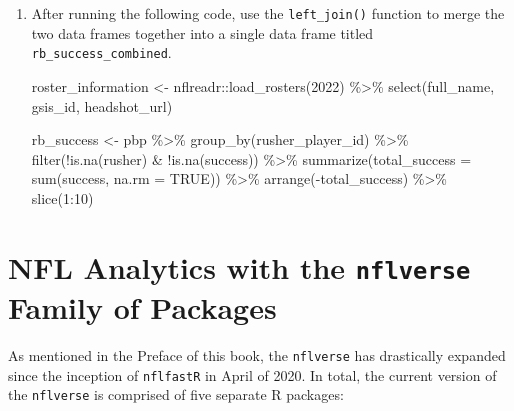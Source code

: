 \documentclass[
  letterpaper,
]{krantz}
\newenvironment{Shaded}{\begin{snugshade}}{\end{snugshade}}
\newcommand{\AttributeTok}[1]{\textcolor[rgb]{0.40,0.45,0.13}{#1}}
\newcommand{\ConstantTok}[1]{\textcolor[rgb]{0.56,0.35,0.01}{#1}}
\newcommand{\DecValTok}[1]{\textcolor[rgb]{0.68,0.00,0.00}{#1}}
\newcommand{\FunctionTok}[1]{\textcolor[rgb]{0.28,0.35,0.67}{#1}}
\newcommand{\NormalTok}[1]{\textcolor[rgb]{0.00,0.23,0.31}{#1}}
\newcommand{\OtherTok}[1]{\textcolor[rgb]{0.00,0.23,0.31}{#1}}
\newcommand{\SpecialCharTok}[1]{\textcolor[rgb]{0.37,0.37,0.37}{#1}}
\begin{document}
\begin{enumerate}
\def\labelenumi{\arabic{enumi}.}
\item
  After running the following code, use the \texttt{left\_join()}
  function to merge the two data frames together into a single data
  frame titled \texttt{rb\_success\_combined}.

\begin{Shaded}
\begin{Highlighting}[]
\NormalTok{roster\_information }\OtherTok{\textless{}{-}}\NormalTok{ nflreadr}\SpecialCharTok{::}\FunctionTok{load\_rosters}\NormalTok{(}\DecValTok{2022}\NormalTok{) }\SpecialCharTok{\%\textgreater{}\%}
  \FunctionTok{select}\NormalTok{(full\_name, gsis\_id, headshot\_url)}

\NormalTok{rb\_success }\OtherTok{\textless{}{-}}\NormalTok{ pbp }\SpecialCharTok{\%\textgreater{}\%}
  \FunctionTok{group\_by}\NormalTok{(rusher\_player\_id) }\SpecialCharTok{\%\textgreater{}\%}
  \FunctionTok{filter}\NormalTok{(}\SpecialCharTok{!}\FunctionTok{is.na}\NormalTok{(rusher) }\SpecialCharTok{\&} \SpecialCharTok{!}\FunctionTok{is.na}\NormalTok{(success)) }\SpecialCharTok{\%\textgreater{}\%}
  \FunctionTok{summarize}\NormalTok{(}\AttributeTok{total\_success =} \FunctionTok{sum}\NormalTok{(success, }\AttributeTok{na.rm =} \ConstantTok{TRUE}\NormalTok{)) }\SpecialCharTok{\%\textgreater{}\%}
  \FunctionTok{arrange}\NormalTok{(}\SpecialCharTok{{-}}\NormalTok{total\_success) }\SpecialCharTok{\%\textgreater{}\%}
  \FunctionTok{slice}\NormalTok{(}\DecValTok{1}\SpecialCharTok{:}\DecValTok{10}\NormalTok{)}
\end{Highlighting}
\end{Shaded}
\end{enumerate}


\hypertarget{nfl-analytics-with-the-nflverse-family-of-packages}{%
\chapter{\texorpdfstring{NFL Analytics with the \texttt{nflverse} Family
of
Packages}{NFL Analytics with the nflverse Family of Packages}}\label{nfl-analytics-with-the-nflverse-family-of-packages}}

As mentioned in the Preface of this book, the \texttt{nflverse} has
drastically expanded since the inception of \texttt{nflfastR} in April
of 2020. In total, the current version of the \texttt{nflverse} is
comprised of five separate R packages:
\end{document}
